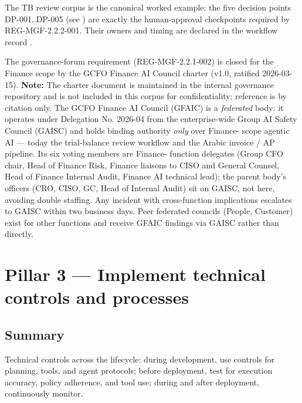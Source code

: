 The TB review corpus is the canonical worked example: the five decision
points DP-001..DP-005 (see )
are exactly the human-approval checkpoints required by
REG-MGF-2.2.2-001.  Their owners and timing are declared in the workflow
record .

The governance-forum requirement (REG-MGF-2.2.1-002) is closed for the
Finance scope by the GCFO Finance AI Council charter (v1.0, ratified
2026-03-15). \textbf{Note:} The charter document is maintained in the
internal governance repository and is not included in this corpus for
confidentiality; reference is by citation only. The GCFO Finance AI
Council (GFAIC) is a \emph{federated} body: it operates under
Delegation No. 2026-04 from the enterprise-wide Group AI Safety
Council (GAISC) and holds binding authority \emph{only} over Finance-
scope agentic AI --- today the trial-balance review workflow and the
Arabic invoice / AP pipeline. Its six voting members are Finance-
function delegates (Group CFO chair, Head of Finance Risk, Finance
liaisons to CISO and General Counsel, Head of Finance Internal Audit,
Finance AI technical lead); the parent body's officers (CRO, CISO,
GC, Head of Internal Audit) sit on GAISC, not here, avoiding double
staffing. Any incident with cross-function implications escalates to
GAISC within two business days. Peer federated councils (People,
Customer) exist for other functions and receive GFAIC findings via
GAISC rather than directly.

\section{Pillar 3 --- Implement technical controls and processes}
\label{sec:mgf-p3}

\subsection*{Summary}

Technical controls across the lifecycle: during development, use
controls for planning, tools, and agent protocols; before deployment,
test for execution accuracy, policy adherence, and tool use; during and
after deployment, continuously monitor.


